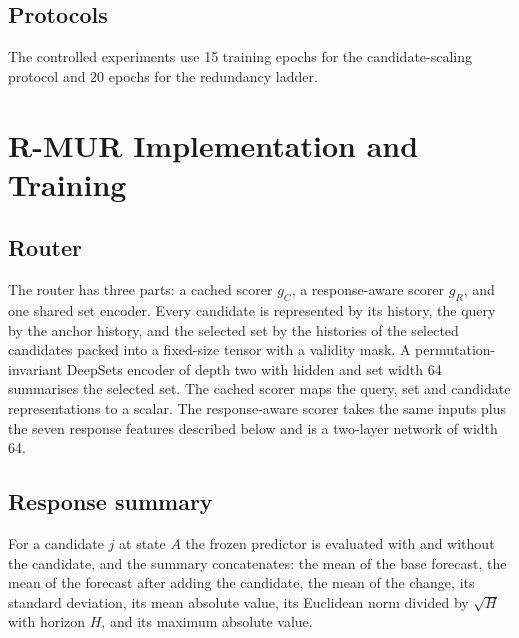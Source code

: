 \documentclass[preprint,12pt]{elsarticle}
\begin{document}
\subsection{Protocols}
\begin{table}[t]
\centering
\small
\caption{Controlled protocols. All reported gains are loss reductions relative
to the anchor-only predictor. Seeds are independent training and evaluation
runs.}
\end{table}

The controlled experiments use 15 training epochs for the candidate-scaling
protocol and 20 epochs for the redundancy ladder.

\section{R-MUR Implementation and Training}
\label{sec:supp-rmur}

\subsection{Router}
The router has three parts: a cached scorer $g_C$, a response-aware scorer
$g_R$, and one shared set encoder. Every candidate is represented by its
history, the query by the anchor history, and the selected set by the
histories of the selected candidates packed into a fixed-size tensor with a
validity mask. A permutation-invariant DeepSets encoder of depth two with
hidden and set width 64 summarises the selected set. The cached scorer maps the
query, set and candidate representations to a scalar. The response-aware
scorer takes the same inputs plus the seven response features described below
and is a two-layer network of width 64.

\subsection{Response summary}
For a candidate $j$ at state $A$ the frozen predictor is evaluated with and
without the candidate, and the summary concatenates: the mean of the base
forecast, the mean of the forecast after adding the candidate, the mean of the
change, its standard deviation, its mean absolute value, its Euclidean norm
divided by $\sqrt{H}$ with horizon $H$, and its maximum absolute value.
\end{document}
